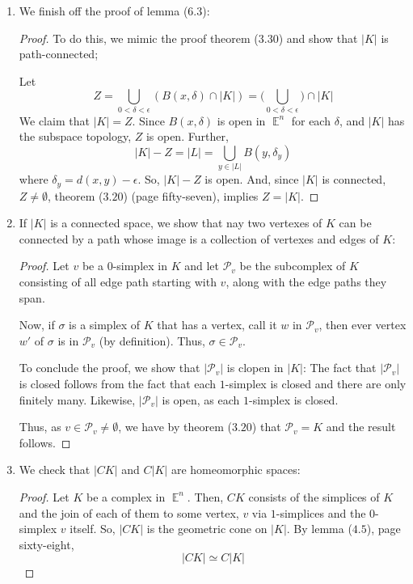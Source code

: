 \documentclass{book}
\DeclareMathOperator*{\E}{\mathbb{E}}
\begin{document}
\begin{enumerate}[(1)]
    \item We finish off the proof of lemma ($6.3$):
        \begin{proof} To do this, we mimic the proof theorem ($3.30$) and show that $|K|$ is path-connected; 
            \par Let 
            \[Z = \bigcup_{0 < \delta < \epsilon} (B(x,\delta) \cap |K|) = \Big(\bigcup_{0 < \delta < \epsilon}\Big) \cap |K| \]
            We claim that $|K| = Z$. Since $B(x,\delta)$ is open in $\E^n$ for each $\delta$, and $|K|$ has the subspace topology, $Z$ is open. Further, 
            \[|K| - Z = |L| = \bigcup_{y \in |L|} B(y, \delta_y)\]
            where $\delta_y = d(x,y) - \epsilon$. So, $|K| - Z$ is open. And, since $|K|$ is connected, $Z \neq \emptyset$, theorem ($3.20$) (page fifty-seven), implies $Z = |K|$. 
        \end{proof}

    \item If $|K|$ is a connected space, we show that nay two vertexes of $K$ can be connected by a path whose image is a collection of vertexes and edges of $K$:   
        \begin{proof} Let $v$ be a $0$-simplex in $K$ and let $\mathcal{P}_v$ be the subcomplex of $K$ consisting of all edge path starting with $v$, along with the edge paths they span. 
            \par Now, if $\sigma$ is a simplex of $K$ that has a vertex, call it $w$ in $\mathcal{P}_v$, then ever vertex $w'$ of $\sigma$ is in $\mathcal{P}_v$ (by definition). Thus, $\sigma \in \mathcal{P}_v$.
            \par To conclude the proof, we show that $|\mathcal{P}_v|$ is clopen in $|K|$: The fact that $|\mathcal{P}_v|$ is closed follows from the fact that each $1$-simplex is closed and there are only finitely many. Likewise, $|\mathcal{P}_v|$ is open, as each $1$-simplex is closed. 
            \par Thus, as $v \in \mathcal{P}_v \neq \emptyset$, we have by theorem ($3.20$) that $\mathcal{P}_v = K$ and the result follows. 
        \end{proof}

    \item We check that $|CK|$ and $C|K|$ are homeomorphic spaces: 
        \begin{proof} Let $K$ be a complex in $\E^n$. Then, $CK$ consists of the simplices of $K$ and the join of each of them to some vertex, $v$ via $1$-simplices and the $0$-simplex $v$ itself. So, $|CK|$ is the geometric cone on $|K|$. By lemma ($4.5$), page sixty-eight, 
            \[ |CK| \simeq C|K|\]
        \end{proof}


\end{enumerate}
\end{document}

